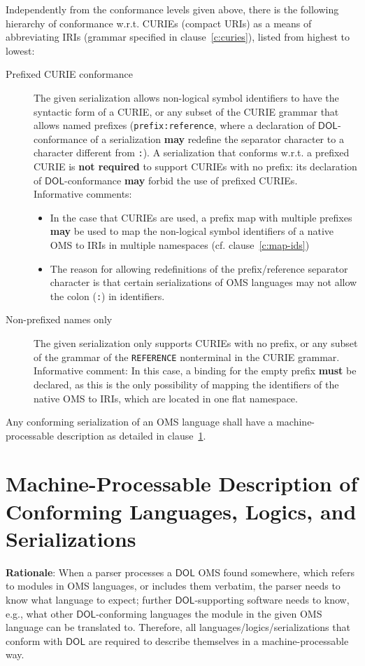 \documentclass[10pt,fleqn,final]{scrreprt}
\makeatletter
\newcommand{\cbs}[0]{\color{red}\xspace} %
\newcommand{\cbe}[0]{\color{black}\xspace} %
\newcommand*{\cf}{cf.\@\xspace}
\newcommand*{\wrt}{w.r.t.\@\xspace}
\newcommand*{\syntax}[1]{\texttt{#1}}
\newcommand*{\notrequired}{\textbf{not required}\xspace}
\newcommand*{\may}{\textbf{may}\xspace}
\newcommand*{\hasto}{\textbf{must}\xspace}
\newcommand*{\DOL}{\ensuremath{\mathsf{DOL}}\xspace}
\newcommand{\clauserefname}{clause}
\newcommand{\cref}[1]{\clauserefname~\ref{#1}}
\newcommand{\sclause}[1]{\section{#1}}
\makeatother
\begin{document}
Independently from the conformance levels given above, there is the following hierarchy of conformance \wrt CURIEs (compact URIs) as a means of abbreviating IRIs (grammar specified in \cref{c:curies}), listed from highest to lowest:
\begin{description}
\item[Prefixed CURIE conformance] The given serialization allows non-logical symbol identifiers to have the syntactic form of a CURIE, or any subset of the CURIE grammar that allows named prefixes (\syntax{prefix:reference}, where a declaration of \DOL-conformance of a serialization \may redefine the separator character to a character different from \syntax{:}).  A serialization that conforms \wrt\cbs a\cbe prefixed CURIE  is \notrequired to support CURIEs with no prefix: its declaration of \DOL-conformance \may forbid the use of prefixed CURIEs.\\
  Informative comments:
  \begin{itemize}
  \item In the case that CURIEs are used, a prefix map with multiple prefixes \may be used to map the non-logical symbol identifiers of a native OMS to IRIs in multiple namespaces (\cf \cref{c:map-ids})
  \item The reason for allowing redefinitions of the prefix/reference separator character is that certain serializations of OMS languages may not allow the colon (\syntax{:}) in identifiers.
  \end{itemize}
\item[Non-prefixed names only] The given serialization only supports CURIEs with no prefix, or any subset of the grammar of the \syntax{REFERENCE} nonterminal in the CURIE grammar.\\
  Informative comment: In this case, a binding for the empty prefix \hasto be declared, as this is the only possibility of mapping the identifiers of the native OMS to IRIs, which are located in one flat namespace.
\end{description}

Any conforming serialization of an OMS language shall have a machine-processable description as detailed in \cref{c:conform:description}.

\sclause{Machine-Processable Description of Conforming Languages, Logics, and Serializations}\label{c:conform:description}

\begin{fminipage}{\textwidth}
\textbf{Rationale}: When a parser processes a \DOL OMS found somewhere, which refers to modules in OMS languages, or includes them verbatim, the parser needs to know what language to expect; further \DOL-supporting software needs to know, e.g., what other \DOL-conforming languages the module in the given OMS language can be translated to.  Therefore,  \cbs all languages/logics/serializations that conform with \DOL are required to describe themselves in a machine-processable way.
\cbe
\end{fminipage}
\end{document}

